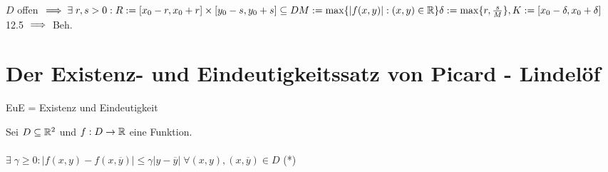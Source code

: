 \documentclass[a4paper,twoside,DIV15,BCOR12mm]{scrbook}
\begin{document}
\begin{beweis}
$D$ offen $\implies \exists \; r, s > 0 : R := [x_0 - r, x_0 + r] \times [y_0 - s, y_0 + s] \subseteq D \\
M := \max \{|f(x,y)| : (x,y) \in \mathbb{R} \} \\
\delta := \max \{r, \frac {s}{M}\}, K := [x_0 - \delta, x_0 + \delta]$ 12.5 $\implies$ Beh.
\end{beweis}


\chapter{Der Existenz- und Eindeutigkeitssatz von Picard - Lindelöf}

EuE = Existenz und Eindeutigkeit

\begin{definition}
Sei $D \subseteq \mathbb{R}^2$ und $f: D \rightarrow \mathbb{R}$ eine Funktion. \\
 \equizu \\
$\exists \; \gamma \geq 0 : |f(x,y) - f(x,\overline{y})| \leq \gamma |y - \overline{y}| \; \forall (x,y), (x,\overline{y}) \in D$ \; (*)
\end{definition}
\end{document}
